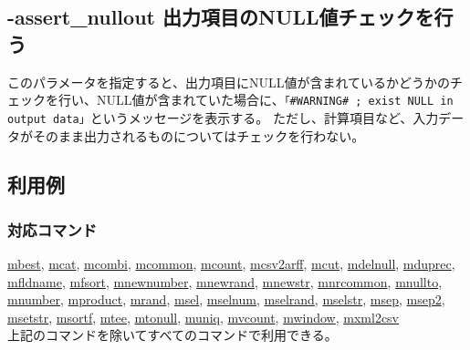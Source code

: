 

%

\subsection{-assert\_nullout 出力項目のNULL値チェックを行う \label{sect:option_assert_nullout}}

このパラメータを指定すると、出力項目にNULL値が含まれているかどうかのチェックを行い、NULL値が含まれていた場合に、\verb|「#WARNING# ; exist NULL in output data」|というメッセージを表示する。
ただし、計算項目など、入力データがそのまま出力されるものについてはチェックを行わない。

\subsection*{利用例}


\subsubsection*{対応コマンド}
\hyperref[sect:mbest]{mbest},
\hyperref[sect:mcat]{mcat},
\hyperref[sect:mcombi]{mcombi},
\hyperref[sect:mcommon]{mcommon},
\hyperref[sect:mcount]{mcount},
\hyperref[sect:mcsv2arff]{mcsv2arff},
\hyperref[sect:mcut]{mcut},
\hyperref[sect:mdelnull]{mdelnull},
\hyperref[sect:mduprec]{mduprec},
\hyperref[sect:mfldname]{mfldname},
\hyperref[sect:mfsort]{mfsort},
\hyperref[sect:mnewnumber]{mnewnumber},
\hyperref[sect:mnewrand]{mnewrand},
\hyperref[sect:mnewstr]{mnewstr},
\hyperref[sect:mnrcommon]{mnrcommon},
\hyperref[sect:mnullto]{mnullto},
\hyperref[sect:mnumber]{mnumber},
\hyperref[sect:mproduct]{mproduct},
\hyperref[sect:mrand]{mrand},
\hyperref[sect:msel]{msel},
\hyperref[sect:mselnum]{mselnum},
\hyperref[sect:mselrand]{mselrand},
\hyperref[sect:mselstr]{mselstr},
\hyperref[sect:msep]{msep},
\hyperref[sect:msep2]{msep2},
\hyperref[sect:msetstr]{msetstr},
\hyperref[sect:msortf]{msortf},
\hyperref[sect:mtee]{mtee},
\hyperref[sect:mtonull]{mtonull},
\hyperref[sect:muniq]{muniq},
\hyperref[sect:mvcount]{mvcount},
\hyperref[sect:mwindow]{mwindow},
\hyperref[sect:mxml2csv]{mxml2csv}\\
上記のコマンドを除いてすべてのコマンドで利用できる。

%

